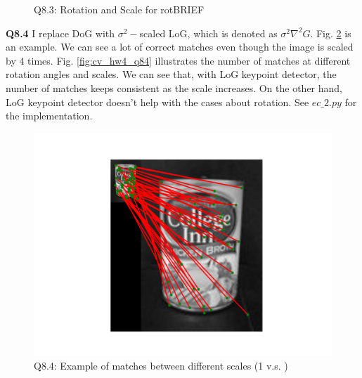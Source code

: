 \documentclass[
  course = {{16-720B Computer Vision}},
  quartile = {{1}},
  assignment = 4\ -\ Feature\ Descriptors\ \&\ Homographies\ \& \  RANSAC,
  name = {{Kangle Deng}},
  email = {{kangled@andrew.cmu.edu}},
  firstexercise = 1
]{aga-homework}
\begin{document}
\begin{figure}
    \centering
    \caption{Q8.3: Rotation and Scale for rotBRIEF}
    \label{fig:cv_hw4_q83}
\end{figure}

\noindent \textbf{Q8.4} I replace DoG with $\sigma^2-$scaled LoG, which is denoted as $\sigma^2\nabla^2G$. Fig. \ref{fig:cv_hw4_q84_example} is an example. We can see a lot of correct matches even though the image is scaled by 4 times. Fig. \ref{fig:cv_hw4_q84} illustrates the number of matches at different rotation angles and scales. We can see that, with LoG keypoint detector, the number of matches keeps consistent as the scale increases. On the other hand, LoG keypoint detector doesn't help with the cases about rotation. See $ec\_2.py$ for the implementation.

\begin{figure}
    \centering
    \includegraphics{CV/fig/hw4/q84_example.png}
    \caption{Q8.4: Example of matches between different scales (1 \times \quad v.s.  \times)}
    \label{fig:cv_hw4_q84_example}
\end{figure}
\end{document}

